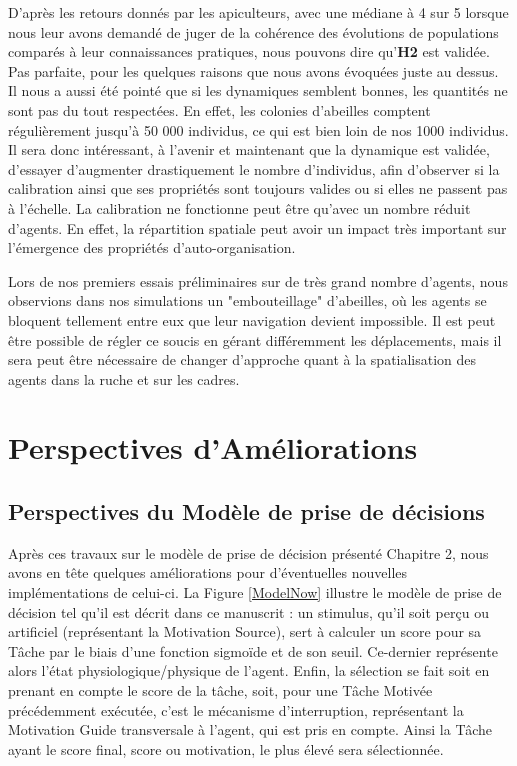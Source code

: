 		 D'après les retours donnés par les apiculteurs, avec une médiane à 4 sur 5 lorsque nous leur avons demandé de juger de la cohérence des évolutions de populations comparés à leur connaissances pratiques, nous pouvons dire qu'\textbf{H2} est validée. Pas parfaite, pour les quelques raisons que nous avons évoquées juste au dessus. Il nous a aussi été pointé que si les dynamiques semblent bonnes, les quantités ne sont pas du tout respectées. En effet, les colonies d'abeilles comptent régulièrement jusqu'à 50 000 individus, ce qui est bien loin de nos 1000 individus. Il sera donc intéressant, à l'avenir et maintenant que la dynamique est validée, d'essayer d'augmenter drastiquement le nombre d'individus, afin d'observer si la calibration ainsi que ses propriétés sont toujours valides ou si elles ne passent pas à l'échelle. La calibration ne fonctionne peut être qu'avec un nombre réduit d'agents. En effet, la répartition spatiale peut avoir un impact très important sur l'émergence des propriétés d'auto-organisation.
		 
		 Lors de nos premiers essais préliminaires sur de très grand nombre d'agents, nous observions dans nos simulations un "embouteillage" d'abeilles, où les agents se bloquent tellement entre eux que leur navigation devient impossible. Il est peut être possible de régler ce soucis en gérant différemment les déplacements, mais il sera peut être nécessaire de changer d'approche quant à la spatialisation des agents dans la ruche et sur les cadres.
	
	
	\section{Perspectives d'Améliorations}
	\label{sectionPerspectivesSMA}
	
	\subsection{Perspectives du Modèle de prise de décisions}
	Après ces travaux sur le modèle de prise de décision présenté Chapitre 2, nous avons en tête quelques améliorations pour d'éventuelles nouvelles implémentations de celui-ci. La Figure \ref{ModelNow} illustre le modèle de prise de décision tel qu'il est décrit dans ce manuscrit : un stimulus, qu'il soit perçu ou artificiel (représentant la Motivation Source), sert à calculer un score pour sa Tâche par le biais d'une fonction sigmoïde et de son seuil. Ce-dernier représente alors l'état physiologique/physique de l'agent. Enfin, la sélection se fait soit en prenant en compte le score de la tâche, soit, pour une Tâche Motivée précédemment exécutée, c'est le mécanisme d'interruption, représentant la Motivation Guide transversale à l'agent, qui est pris en compte. Ainsi la Tâche ayant le score final, score ou motivation, le plus élevé sera sélectionnée.
	

